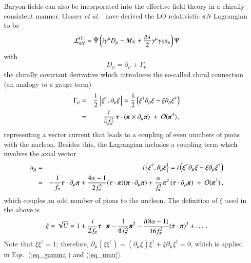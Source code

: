 \documentclass[sort&compress,preprint,3p]{elsarticle}
\begin{document}
Baryon fields can also be incorporated into the effective
field theory in a chirally consistent manner.
Gasser {\it et al.}~\cite{GSS88} have derived
the LO relativistic $\pi N$ Lagrangian to be
\begin{equation}
{\cal L}^{(1)}_{\pi N}  =  
 \bar{\Psi} \left(i\gamma^\mu {D}_\mu 
 - M_N
 + \frac{g_A}{2} \gamma^\mu \gamma_5 u_\mu
  \right) \Psi  
\label{eq_L1rel}
\end{equation}
with
\begin{equation}
{D}_\mu  =  \partial_\mu + \Gamma_\mu 
\end{equation}
the chirally covariant derivative 
which introduces the so-called
chiral connection
(an analogy to a gauge term)
\begin{eqnarray}
\Gamma_\mu & = & 
                 \frac12      \left[
                           \xi^\dagger, \partial_\mu \xi
                              \right]
=                \frac12      \left(
                           \xi^\dagger \partial_\mu \xi
                        +  \xi \partial_\mu \xi^\dagger
                               \right)
\label{eq_gamma}
\\
&=& 
\frac{i}{4f^2_\pi} \,
\mbox{\boldmath $\tau$} \cdot 
 ( \mbox{\boldmath $\pi$}
\times
 \partial_\mu \mbox{\boldmath $\pi$})
 \; + \; {\cal O} (\mbox{\boldmath $\pi$}^4) \,,
\end{eqnarray}
representing a vector current
that leads to a coupling of even numbers of pions with the nucleon.
Besides this, the Lagrangian includes a
coupling term which involves the axial vector
\begin{eqnarray}
u_\mu & = & 
                i \left\{
                           \xi^\dagger, \partial_\mu \xi
                  \right\}
              = i \left(
                           \xi^\dagger \partial_\mu \xi
                        -  \xi \partial_\mu \xi^\dagger
                  \right)  
\label{eq_umu}
\\
       &=&
      - \frac{1}{f_\pi} \mbox{\boldmath{$\tau$}} 
	\cdot \partial_\mu \mbox{\boldmath{$\pi$}}
        + \frac{4\alpha-1}{2f_\pi^3} 
	(\mbox{\boldmath{$\tau$}} \cdot \mbox{\boldmath{$\pi$}})
	(\mbox{\boldmath{$\pi$}} \cdot \partial_\mu \mbox{\boldmath{$\pi$}})
        + \frac{\alpha}{f_\pi^3} 
        \mbox{\boldmath{$\pi$}}^2 \,
	(\mbox{\boldmath{$\tau$}} \cdot \partial_\mu \mbox{\boldmath{$\pi$}})
 \; + \; {\cal O} (\mbox{\boldmath $\pi$}^5)  \,,
\end{eqnarray}
which couples an odd number of pions to the nucleon.
The definition of $\xi$ used in the above is
\begin{equation}
\xi  = \sqrt{U} = 1 +
\frac{i}{2f_\pi}
\mbox{\boldmath $\tau$} \cdot \mbox{\boldmath $\pi$}
-\frac{1}{8f_\pi^2} 
\mbox{\boldmath $\pi$}^2
-\frac{i(8\alpha-1)}{16f_\pi^3}
(\mbox{\boldmath $\tau$} \cdot \mbox{\boldmath $\pi$})^3
+ \ldots \,.
\label{eq_xi}
\end{equation}
Note that 
$\xi\xi^\dagger = 1$; therefore,
$\partial_\mu (\xi\xi^\dagger) =  
 (\partial_\mu \xi ) \xi^\dagger 
+\xi \partial_\mu \xi^\dagger =0$,
which is applied in Eqs.~(\ref{eq_gamma}) and (\ref{eq_umu}).
\end{document}
